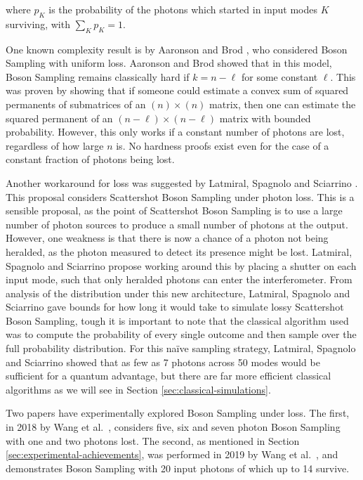 \noindent where $p_K$ is the probability of the photons which started in input modes $K$ surviving, with $\sum_Kp_K = 1$.

One known complexity result is by Aaronson and Brod \cite{aaronson2016}, who considered Boson Sampling with uniform loss. Aaronson and Brod showed that in this model, Boson Sampling remains classically hard if $k=n-\ell$ for some constant $\ell$. This was proven by showing that if someone could estimate a convex sum of squared permanents of submatrices of an $(n)\times(n)$ matrix, then one can estimate the squared permanent of an $(n-\ell)\times(n-\ell)$ matrix with bounded probability. However, this only works if a constant number of photons are lost, regardless of how large $n$ is. No hardness proofs exist even for the case of a constant fraction of photons being lost.

Another workaround for loss was suggested by Latmiral, Spagnolo and Sciarrino \cite{latmiral2016}. This proposal considers Scattershot Boson Sampling under photon loss. This is a sensible proposal, as the point of Scattershot Boson Sampling is to use a large number of photon sources to produce a small number of photons at the output. However, one weakness is that there is now a chance of a photon not being heralded, as the photon measured to detect its presence might be lost. Latmiral, Spagnolo and Sciarrino propose working around this by placing a shutter on each input mode, such that only heralded photons can enter the interferometer. From analysis of the distribution under this new architecture, Latmiral, Spagnolo and Sciarrino gave bounds for how long it would take to simulate lossy Scattershot Boson Sampling, tough it is important to note that the classical algorithm used was to compute the probability of every single outcome and then sample over the full probability distribution. For this na\"ive sampling strategy, Latmiral, Spagnolo and Sciarrino showed that as few as 7 photons across 50 modes would be sufficient for a quantum advantage, but there are far more efficient classical algorithms as we will see in Section \ref{sec:classical-simulations}.

Two papers have experimentally explored Boson Sampling under loss. The first, in 2018 by Wang et al.~\cite{wang2018}, considers five, six and seven photon Boson Sampling with one and two photons lost. The second, as mentioned in Section \ref{sec:experimental-achievements}, was performed in 2019 by Wang et al.~\cite{wang2019}, and demonstrates Boson Sampling with 20 input photons of which up to 14 survive.

